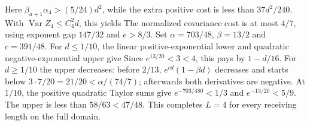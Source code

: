 Here $\beta_{a+1}\alpha_4>\allowbreak (5/24)d^2$, while the extra positive cost
is less than $37d^2/240$.
With $\operatorname{Var}Z_4\le\allowbreak  C_4^2d$, this yields
The normalized covariance cost is at most $4/7$, using exponent gap
$147/32$ and $e>\allowbreak 8/3$.
Set $\alpha=\allowbreak 703/48$, $\beta=\allowbreak 13/2$ and $c=\allowbreak 391/48$.
For $d\le\allowbreak 1/10$, the linear positive-exponential lower and quadratic
negative-exponential upper give
Since $e^{13/20}<\allowbreak 3<\allowbreak 4$, this pays by $1-d/16$.
For $d\ge\allowbreak 1/10$ the upper decreases: before $2/13$,
$e^{cd}(1-\beta d)$ decreases and starts below
$3\cdot7/20=\allowbreak 21/20<\allowbreak \alpha/(74/7)$; afterwards both derivatives are negative.
At $1/10$, the positive quadratic Taylor sums give
$e^{-703/480}<\allowbreak 1/3$ and $e^{-13/20}<\allowbreak 5/9$.
The upper is less than $58/63<\allowbreak 47/48$.
This completes $L=\allowbreak 4$ for every receiving length on the full domain.

